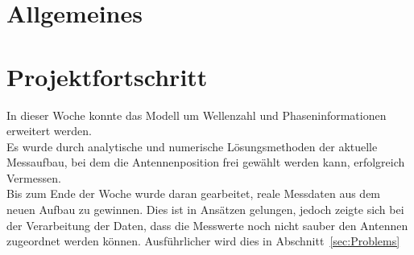 \documentclass[a4paper,12pt,fleqn]{article}
\begin{document}
\setlength{\headheight}{36pt}

\begin{titlepage}



\end{titlepage}

\section[Allgemeines]{Allgemeines}

\section[Fortschritt]{Projektfortschritt}
In dieser Woche konnte das Modell um Wellenzahl und Phaseninformationen erweitert werden.\\
Es wurde durch analytische und numerische Lösungsmethoden der aktuelle Messaufbau, bei dem die Antennenposition frei gewählt werden kann, erfolgreich Vermessen.\\
Bis zum Ende der Woche wurde daran gearbeitet, reale Messdaten aus dem neuen Aufbau zu gewinnen. Dies ist in Ansätzen gelungen, jedoch zeigte sich bei der Verarbeitung der Daten, dass die Messwerte noch nicht sauber den Antennen zugeordnet werden können. Ausführlicher wird dies in Abschnitt~\ref{sec:Problems}

\end{document}
